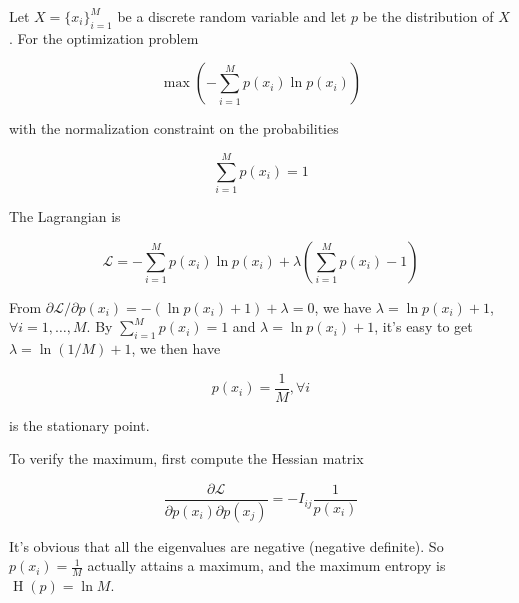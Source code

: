 \documentclass{article}
\begin{document}
                Let $ X = \{x_i\}_{ i=1 }^M $ be a discrete random variable and
                let $ p $ be the distribution of $ X $. For the optimization
                problem

                \begin{equation*}
                     \max \left(
                        - \sum_{i=1}^M p(x_i) \ln p(x_i)
                    \right)
                \end{equation*}

                with the normalization constraint on the probabilities

                \begin{equation*}
                     \sum_{i=1}^M p(x_i) = 1
                \end{equation*}

                The Lagrangian is

                \begin{equation*}
                     \mathcal{L} = - \sum_{i=1}^M p(x_i) \ln p(x_i) +
                         \lambda \left(
                            \sum_{i=1}^M p(x_i) - 1
                         \right)
                \end{equation*}

                From $ \partial \mathcal{L} / \partial p(x_i) = - (\ln p(x_i) + 1) +
                \lambda = 0 $, we have $ \lambda = \ln p(x_i) + 1 $,
                $ \forall i = 1, \dots, M $. By $ \sum_{i=1}^M p(x_{i}) = 1 $ and $
                \lambda = \ln p(x_i) + 1 $, it's easy to get $ \lambda = \ln(1 / M)
                + 1 $, we then have 

                \begin{equation*}
                     p(x_i) = \frac{1}{M}, \forall i
                \end{equation*}

                is the stationary point.

                To verify the maximum, first compute the Hessian matrix

                \begin{equation*}
                     \frac{ \partial \mathcal{L} }{ \partial p(x_{i}) \partial
                     p(x_{j}) } = - I_{ij} \frac{1}{p(x_i)}
                \end{equation*}

                It's obvious that all the eigenvalues are negative (negative
                definite). So $ p(x_{i}) = \frac{1}{M} $ actually attains a
                maximum, and the maximum entropy is $ \operatorname{H}(p) = \ln
                M $.
\end{document}
